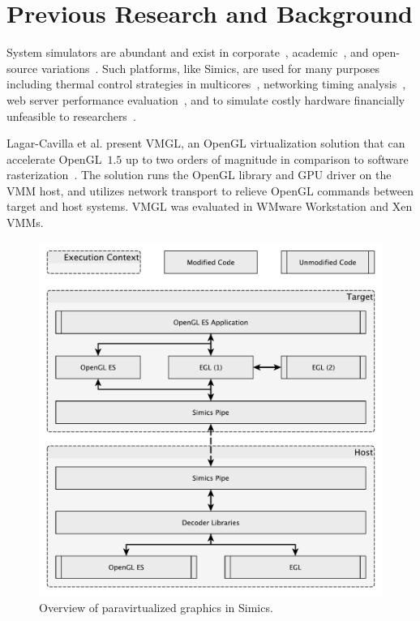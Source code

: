 
\section{Previous Research and Background}
\label{sec:previousresearch}
System simulators are abundant and exist in corporate~, academic~, and open-source variations~.
Such platforms, like Simics, are used for many purposes including thermal control strategies in multicores~, networking timing analysis~, web server performance evaluation~, and to simulate costly hardware financially unfeasible to researchers~.

Lagar-Cavilla et al. present VMGL, an OpenGL virtualization solution that can accelerate OpenGL~$1.5$ up to two orders of magnitude in comparison to software rasterization~.
The solution runs the OpenGL library and GPU driver on the VMM host, and utilizes network transport to relieve OpenGL commands between target and host systems.
VMGL was evaluated in WMware Workstation and Xen VMMs.

\begin{figure}
\centering
\includegraphics[width=\linewidth]{img/yedoverview.pdf}
\caption{Overview of paravirtualized graphics in Simics.}
\label{fig:overview}
\end{figure}
